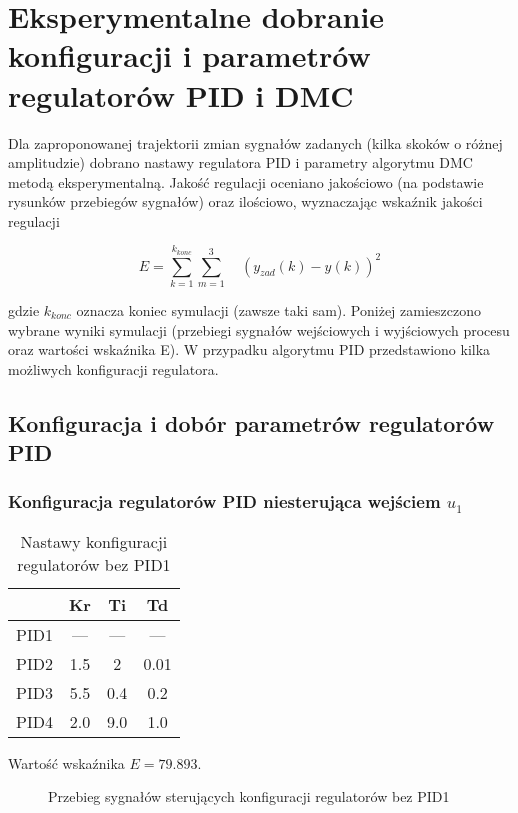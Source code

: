 \section{Eksperymentalne dobranie konfiguracji i parametrów regulatorów PID i DMC}
\label{projekt:zad4}

Dla zaproponowanej trajektorii zmian sygnałów zadanych (kilka skoków o różnej amplitudzie)
dobrano nastawy regulatora PID i parametry algorytmu DMC metodą eksperymentalną.
Jakość regulacji oceniano jakościowo (na podstawie rysunków przebiegów
sygnałów) oraz ilościowo, wyznaczając wskaźnik jakości regulacji

$$
E=\sum_{k=1}^{k_{konc}} \sum_{m=1}^{3} \quad (y_{zad}(k)-y(k))^{2}
$$

gdzie $k_{konc}$ oznacza koniec symulacji (zawsze taki sam). Poniżej zamieszczono wybrane wyniki symulacji
(przebiegi sygnałów wejściowych i wyjściowych procesu oraz wartości wskaźnika
E). 
\newline
W przypadku algorytmu PID przedstawiono kilka możliwych konfiguracji regulatora.

\subsection{Konfiguracja i dobór parametrów regulatorów PID}

\subsubsection{Konfiguracja regulatorów PID niesterująca wejściem $u_{1}$}

\begin{table}[H]
    \centering
    \begin{tabular}{|l|c|c|c|}
    \hline
         & Kr  & Ti  & Td  \\ \hline
    PID1 & --- & --- & --- \\ \hline
    PID2 & 1.5 & 2 & 0.01  \\ \hline
    PID3 & 5.5 & 0.4 & 0.2 \\ \hline
    PID4 & 2.0 & 9.0 & 1.0 \\ \hline
    \end{tabular}
    \caption[H]{Nastawy konfiguracji regulatorów bez PID1}
\end{table}

Wartość wskaźnika $E=\num{79.893}$.

\ifdefined\CompileFigures
    \begin{figure}[H] 
        \centering
        
        \caption{Przebieg sygnałów sterujących konfiguracji regulatorów bez PID1}
        \label{projekt:zad4:figure:uprojzadanie4PIDbezu1u}
    \end{figure}
\fi


